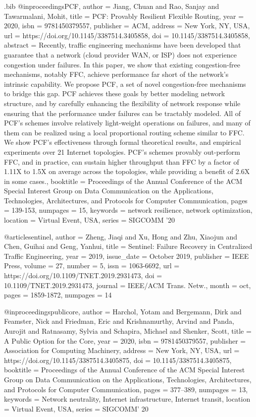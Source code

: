 \documentclass[sigconf]{acmart}
\begin{document}
\begin{filecontents}{\jobname.bib}
@inproceedings{PCF, author = {Jiang, Chuan and Rao, Sanjay and Tawarmalani, Mohit}, title = {PCF: Provably Resilient Flexible Routing}, year = {2020}, isbn = {9781450379557}, publisher = {ACM}, address = {New York, NY, USA}, url = {https://doi.org/10.1145/3387514.3405858}, doi = {10.1145/3387514.3405858}, abstract = {Recently, traffic engineering mechanisms have been developed that guarantee that a network (cloud provider WAN, or ISP) does not experience congestion under failures. In this paper, we show that existing congestion-free mechanisms, notably FFC, achieve performance far short of the network's intrinsic capability. We propose PCF, a set of novel congestion-free mechanisms to bridge this gap. PCF achieves these goals by better modeling network structure, and by carefully enhancing the flexibility of network response while ensuring that the performance under failures can be tractably modeled. All of PCF's schemes involve relatively light-weight operations on failures, and many of them can be realized using a local proportional routing scheme similar to FFC. We show PCF's effectiveness through formal theoretical results, and empirical experiments over 21 Internet topologies. PCF's schemes provably out-perform FFC, and in practice, can sustain higher throughput than FFC by a factor of 1.11X to 1.5X on average across the topologies, while providing a benefit of 2.6X in some cases.}, booktitle = {Proceedings of the Annual Conference of the ACM Special Interest Group on Data Communication on the Applications, Technologies, Architectures, and Protocols for Computer Communication}, pages = {139-153}, numpages = {15}, keywords = {network resilience, network optimization}, location = {Virtual Event, USA}, series = {SIGCOMM '20} }
 
 
 @article{sentinel, author = {Zheng, Jiaqi and Xu, Hong and Zhu, Xiaojun and Chen, Guihai and Geng, Yanhui}, title = {Sentinel: Failure Recovery in Centralized Traffic Engineering}, year = {2019}, issue_date = {October 2019}, publisher = {IEEE Press}, volume = {27}, number = {5}, issn = {1063-6692}, url = {https://doi.org/10.1109/TNET.2019.2931473}, doi = {10.1109/TNET.2019.2931473}, journal = {IEEE/ACM Trans. Netw.}, month = oct, pages = {1859-1872}, numpages = {14} }
 
 @inproceedings{publicore, author = {Harchol, Yotam and Bergemann, Dirk and Feamster, Nick and Friedman, Eric and Krishnamurthy, Arvind and Panda, Aurojit and Ratnasamy, Sylvia and Schapira, Michael and Shenker, Scott}, title = {A Public Option for the Core}, year = {2020}, isbn = {9781450379557}, publisher = {Association for Computing Machinery}, address = {New York, NY, USA}, url = {https://doi.org/10.1145/3387514.3405875}, doi = {10.1145/3387514.3405875}, booktitle = {Proceedings of the Annual Conference of the ACM Special Interest Group on Data Communication on the Applications, Technologies, Architectures, and Protocols for Computer Communication}, pages = {377–389}, numpages = {13}, keywords = {Network neutrality, Internet infrastructure, Internet transit}, location = {Virtual Event, USA}, series = {SIGCOMM' 20} }




 \end{filecontents}
\end{document}

